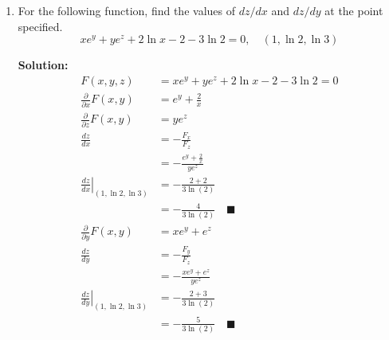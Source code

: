 \documentclass[letterpaper, 11pt]{article}
\begin{document}
\begin{enumerate}
\item For the following function, find the values of $dz/dx$ and $dz/dy$ at the point specified.
\[ xe^y + y e^z  + 2 \ln x - 2 - 3 \ln2 = 0, \quad (1, \ln 2, \ln3) \]
\par \textbf{Solution:}
\begin{align*}
F(x,y,z) &= xe^y + y e^z  + 2 \ln x - 2 - 3 \ln2 = 0 \\
\frac{\partial}{\partial x} F(x,y) &= e^y + \frac{2}{x} \\
\frac{ \partial}{\partial z} F(x,y) &= ye^z \\
\frac{dz}{dx} &= - \frac{ F_x}{F_z} \\
& = -\frac{ e^y + \frac{2}{x} }{ ye^z } \\
\left. \frac{dz}{dx}\right|_{(1, \ln 2, \ln3)} &=  -\frac{ 2 + 2 }{3\ln(2)} \\
&= - \frac{4}{3 \ln (2)} \quad\blacksquare \\
\frac{ \partial}{\partial y} F(x,y) &= xe^y + e^z \\
\frac{dz}{dy} &= - \frac{ F_y}{F_z} \\
& = -\frac{  xe^y + e^z  }{ ye^z } \\
\left. \frac{dz}{dy}\right|_{(1, \ln 2, \ln3)} &=  -\frac{ 2 + 3}{3\ln(2)} \\
&= - \frac{5}{3 \ln (2)} \quad\blacksquare 
\end{align*}

\end{enumerate}
\end{document}
